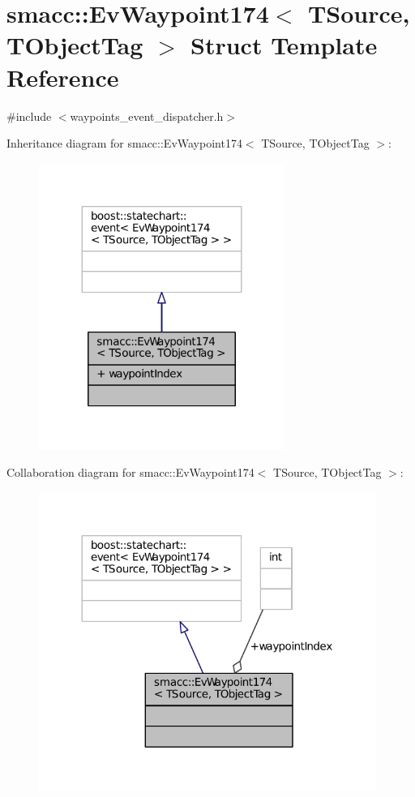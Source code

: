\hypertarget{structsmacc_1_1EvWaypoint174}{}\section{smacc\+:\+:Ev\+Waypoint174$<$ T\+Source, T\+Object\+Tag $>$ Struct Template Reference}
\label{structsmacc_1_1EvWaypoint174}


{\ttfamily \#include $<$waypoints\+\_\+event\+\_\+dispatcher.\+h$>$}



Inheritance diagram for smacc\+:\+:Ev\+Waypoint174$<$ T\+Source, T\+Object\+Tag $>$\+:
\nopagebreak
\begin{figure}[H]
\begin{center}
\leavevmode
\includegraphics[width=227pt]{structsmacc_1_1EvWaypoint174__inherit__graph}
\end{center}
\end{figure}


Collaboration diagram for smacc\+:\+:Ev\+Waypoint174$<$ T\+Source, T\+Object\+Tag $>$\+:
\nopagebreak
\begin{figure}[H]
\begin{center}
\leavevmode
\includegraphics[width=312pt]{structsmacc_1_1EvWaypoint174__coll__graph}
\end{center}
\end{figure}
